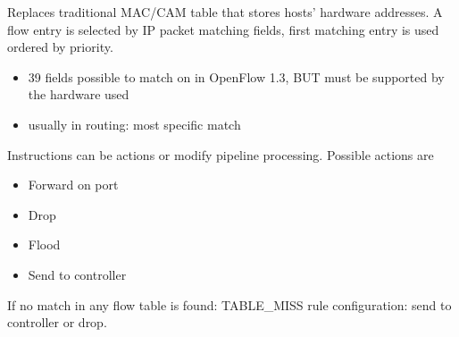 Replaces traditional MAC/CAM table that stores hosts' hardware addresses. A flow entry is selected by IP packet matching fields, first matching entry is used ordered by priority.
\begin{itemize}
	\item 39 fields possible to match on in OpenFlow 1.3, BUT must be supported by the hardware used
	\item usually in routing: most specific match
\end{itemize}

Instructions can be actions or modify pipeline processing. Possible actions are
\begin{itemize}
	\item Forward on port
	\item Drop
	\item Flood
	\item Send to controller
\end{itemize}

If no match in any flow table is found: TABLE\_MISS rule configuration: send to controller or drop.
